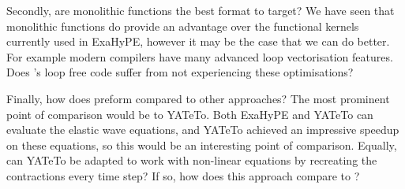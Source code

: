 Secondly, are monolithic functions the best format to target?
We have seen that monolithic functions do provide an advantage over the functional kernels currently used in ExaHyPE, however it may be the case that we can do better.
For example modern compilers have many advanced loop vectorisation features.
Does \phlat{}'s loop free code suffer from not experiencing these optimisations?


Finally, how does \phlat preform compared to other approaches?
The most prominent point of comparison would be to YATeTo.
Both ExaHyPE and YATeTo can evaluate the elastic wave equations, and YATeTo achieved an impressive speedup on these equations, so this would be an interesting point of comparison.
Equally, can YATeTo be adapted to work with non-linear equations by recreating the contractions every time step?
If so, how does this approach compare to \phlat?

